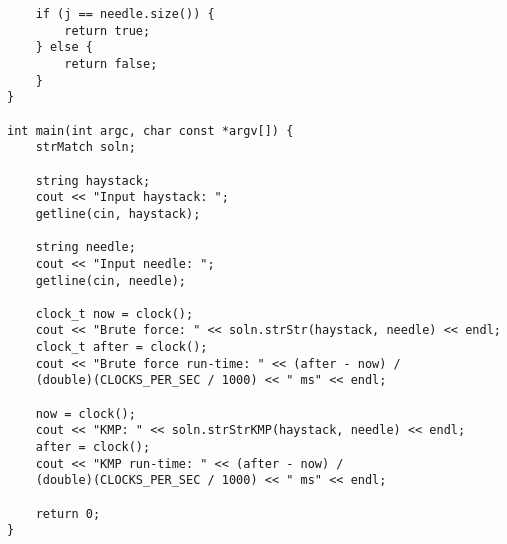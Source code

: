 \documentclass[a4paper, 11pt]{amsart}
\theoremstyle{remark}
\numberwithin{equation}{section}
\begin{document}
\begin{lstlisting}
	if (j == needle.size()) {
		return true;
	} else {
		return false;
	}  
}

int main(int argc, char const *argv[]) {
	strMatch soln;

	string haystack;
	cout << "Input haystack: ";
	getline(cin, haystack);

	string needle;
	cout << "Input needle: ";
	getline(cin, needle);

	clock_t now = clock();
	cout << "Brute force: " << soln.strStr(haystack, needle) << endl;
	clock_t after = clock();
	cout << "Brute force run-time: " << (after - now) / 
	(double)(CLOCKS_PER_SEC / 1000) << " ms" << endl;

	now = clock();
	cout << "KMP: " << soln.strStrKMP(haystack, needle) << endl;
	after = clock();
	cout << "KMP run-time: " << (after - now) / 
	(double)(CLOCKS_PER_SEC / 1000) << " ms" << endl;

	return 0;
}
\end{lstlisting}
\end{document}
